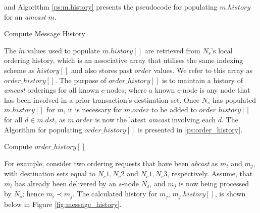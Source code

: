 \begin{enumerate}
        and Algorithm \ref{ps:m.history} presents the pseudocode for populating $m.history$ for an \emph{amcast} $m$.  
        
      \begin{algorithm}
       \caption{Compute Message History}
        \label{ps:m.history}
        \begin{algorithmic}[1]
                \ELSE
                \ENDIF
            \ENDFOR
        \end{algorithmic}
    \end{algorithm}
         
        The $\tilde{m}$ values used to populate $m.history[]$ are retrieved from $N_s$'s local ordering history, which is an associative array that utilises the same indexing scheme as $history[]$ and also stores past $order$ values.  We refer to this array as $order\_history[]$.  The purpose of $order\_history[]$ is to maintain a history of \emph{amcast} orderings for all known $c$-nodes; where a known $c$-node is any node that has been involved in a prior transaction's destination set.  Once $N_s$ has populated $m.history[]$ for $m$, it is necessary for $m.order$ to be added to $order\_history[]$ for all $d \in m.dst$, as $m.order$ is now the latest \emph{amcast} involving each $d$.  The Algorithm for populating $order\_history[]$ is presented in \ref{ps:order_history}.  
		        
    \begin{algorithm}[h]
       \caption{Compute $order\_history[]$}
        \label{ps:order_history}
        \begin{algorithmic}[1]
                \ENDIF
            \ENDFOR
        \end{algorithmic}
    \end{algorithm}           		        
		        
        For example, consider two ordering requests that have been \emph{abcast} as $m_i$ and $m_j$, with destination sets equal to ${N_c1, N_c2}$ and ${N_c1, N_c3}$, respectively.  Assume, that $m_i$ has already been delivered by an $s$-node $N_s$, and $m_j$ is now being processed by $N_s$; hence $m_i \prec m_j$.  The calculated history for $m_j$, $m_j.history[]$, is shown below in Figure \ref{fig:message_history}.
        

\end{enumerate}

